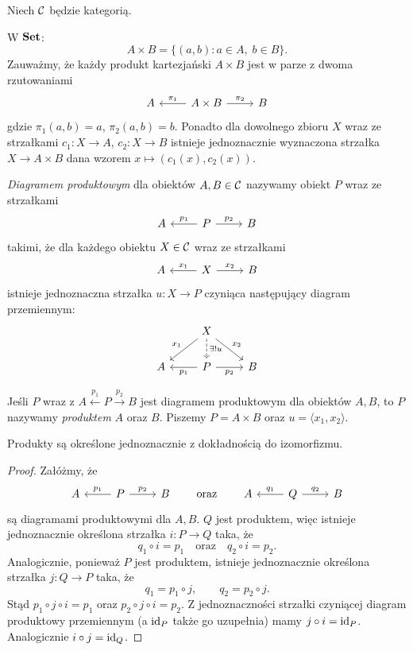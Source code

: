 Niech $\mathcal{C}$ będzie kategorią.

W $\mathbf{Set}$:
\[
A\times B = \{(a,b) : a\in A,\; b\in B\}.
\]
Zauważmy, że każdy produkt kartezjański $A\times B$ jest w parze z dwoma rzutowaniami
\[
\begin{tikzcd}
A & A\times B \arrow[l, "\pi_1"'] \arrow[r, "\pi_2"] & B
\end{tikzcd}
\]
gdzie $\pi_1(a,b) = a$, $\pi_2(a,b)=b$. Ponadto dla dowolnego zbioru $X$ wraz ze strzałkami $c_1\colon X\to A$, $c_2\colon X\to B$ istnieje jednoznacznie wyznaczona strzałka $X\to A\times B$ dana wzorem $x\mapsto (c_1(x),c_2(x))$.

\begin{definicja}\label{def:produkt}
\emph{Diagramem produktowym} dla obiektów $A,B\in\mathcal{C}$ nazywamy obiekt $P$ wraz ze strzałkami
\[
\begin{tikzcd}
A & P \arrow[l, "p_1"'] \arrow[r, "p_2"] & B
\end{tikzcd}
\]
takimi, że dla każdego obiektu $X\in\mathcal{C}$ wraz ze strzałkami
\[
\begin{tikzcd}
A & X \arrow[l, "x_1"'] \arrow[r, "x_2"] & B
\end{tikzcd}
\]
istnieje jednoznaczna strzałka $u\colon X\to P$ czyniąca następujący diagram przemiennym:
\[
\begin{tikzcd}
& X \arrow[ld, "x_1"'] \arrow[rd, "x_2"] \arrow[d, dashed, "\exists! u"] & \\
A & P \arrow[l, "p_1"] \arrow[r, "p_2"'] & B
\end{tikzcd}
\]
\end{definicja}

\begin{definicja}
Jeśli $P$ wraz z $A\xleftarrow{p_1} P\xrightarrow{p_2} B$ jest diagramem produktowym dla obiektów $A,B$, to $P$ nazywamy \emph{produktem} $A$ oraz $B$. Piszemy $P = A\times B$ oraz $u = \langle x_1, x_2\rangle$.
\end{definicja}

\begin{stwierdzenie}
Produkty są określone jednoznacznie z dokładnością do izomorfizmu.
\end{stwierdzenie}

\begin{proof}
Załóżmy, że
\[
\begin{tikzcd}
A & P \arrow[l, "p_1"'] \arrow[r, "p_2"] & B
\end{tikzcd}
\qquad\text{oraz}\qquad
\begin{tikzcd}
A & Q \arrow[l, "q_1"'] \arrow[r, "q_2"] & B
\end{tikzcd}
\]
są diagramami produktowymi dla $A,B$. $Q$ jest produktem, więc istnieje jednoznacznie określona strzałka $i\colon P\to Q$ taka, że
\[
q_1\circ i = p_1 \quad\text{oraz}\quad q_2\circ i = p_2.
\]
Analogicznie, ponieważ $P$ jest produktem, istnieje jednoznacznie określona strzałka $j\colon Q\to P$ taka, że
\[
q_1 = p_1\circ j, \qquad q_2 = p_2\circ j.
\]
Stąd $p_1\circ j\circ i = p_1$ oraz $p_2\circ j\circ i = p_2$. Z jednoznaczności strzałki czyniącej diagram produktowy przemiennym (a $\mathrm{id}_P$ także go uzupełnia) mamy $j\circ i = \mathrm{id}_P$. Analogicznie $i\circ j = \mathrm{id}_Q$.
\end{proof}

